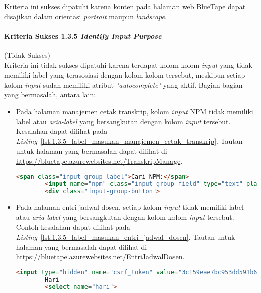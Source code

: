 Kriteria ini sukses dipatuhi karena konten pada halaman web BlueTape dapat disajikan dalam orientasi \textit{portrait} maupun \textit{landscape}.

\paragraph{Kriteria Sukses 1.3.5 \textit{Identify Input Purpose}}
\label{par:kepatuhan_bluetape_kriteria_sukses_1.3.5}
(Tidak Sukses)\\

Kriteria ini tidak sukses dipatuhi karena terdapat kolom-kolom \textit{input} yang tidak memiliki label yang terasosiasi dengan kolom-kolom tersebut, meskipun setiap kolom \textit{input} sudah memiliki atribut \textit{"autocomplete"} yang aktif. Bagian-bagian yang bermasalah, antara lain:
\begin{itemize}
    \item Pada halaman manajemen cetak transkrip, kolom \textit{input} NPM tidak memiliki label atau \textit{aria-label} yang bersangkutan dengan kolom \textit{input} tersebut. Kesalahan dapat dilihat pada \mbox{\textit{Listing} \ref{lst:1.3.5_label_masukan_manajemen_cetak_transkrip}}. Tautan untuk halaman yang bermasalah dapat dilihat di \url{https://bluetape.azurewebsites.net/TranskripManage}. \\
    \begin{lstlisting}[frame=single, label={lst:1.3.5_label_masukan_manajemen_cetak_transkrip}, language=HTML, caption=Pelanggaran Kriteria Sukses 1.3.5 pada Halaman Manajemen Cetak Transkrip]
        <span class="input-group-label">Cari NPM:</span>
        <input name="npm" class="input-group-field" type="text" placeholder="2013730013" maxlength="10" minlength="10"/>
        <div class="input-group-button">
    \end{lstlisting}
    
    \item Pada halaman entri jadwal dosen, setiap kolom \textit{input} tidak memiliki label atau \textit{aria-label} yang bersangkutan dengan kolom-kolom \textit{input} tersebut. Contoh kesalahan dapat dilihat pada \mbox{\textit{Listing} \ref{lst:1.3.5_label_masukan_entri_jadwal_dosen}}. Tautan untuk halaman yang bermasalah dapat dilihat di \url{https://bluetape.azurewebsites.net/EntriJadwalDosen}.
    \begin{lstlisting}[frame=single, label={lst:1.3.5_label_masukan_entri_jadwal_dosen}, language=HTML, caption=Pelanggaran Kriteria Sukses 1.3.5 pada Halaman Entri Jadwal Dosen]
        <input type="hidden" name="csrf_token" value="3c159eae7bc953dd591b679c080ed066" />
        Hari
        <select name="hari">
    \end{lstlisting}
\end{itemize}

